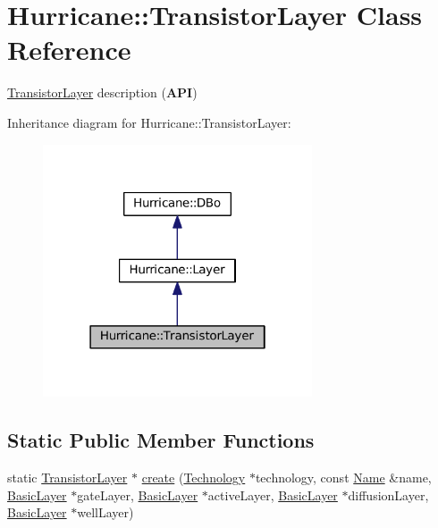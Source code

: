 \hypertarget{classHurricane_1_1TransistorLayer}{}\section{Hurricane\+:\+:Transistor\+Layer Class Reference}
\label{classHurricane_1_1TransistorLayer}


\mbox{\hyperlink{classHurricane_1_1TransistorLayer}{Transistor\+Layer}} description ({\bfseries A\+PI})  




Inheritance diagram for Hurricane\+:\+:Transistor\+Layer\+:\nopagebreak
\begin{figure}[H]
\begin{center}
\leavevmode
\includegraphics[width=226pt]{classHurricane_1_1TransistorLayer__inherit__graph}
\end{center}
\end{figure}
\subsection*{Static Public Member Functions}
\begin{DoxyCompactItemize}
\item 
static \mbox{\hyperlink{classHurricane_1_1TransistorLayer}{Transistor\+Layer}} $\ast$ \mbox{\hyperlink{classHurricane_1_1TransistorLayer_ac34a9a0c5056f1f483b670a1e929ed93}{create}} (\mbox{\hyperlink{classHurricane_1_1Technology}{Technology}} $\ast$technology, const \mbox{\hyperlink{classHurricane_1_1Name}{Name}} \&name, \mbox{\hyperlink{classHurricane_1_1BasicLayer}{Basic\+Layer}} $\ast$gate\+Layer, \mbox{\hyperlink{classHurricane_1_1BasicLayer}{Basic\+Layer}} $\ast$active\+Layer, \mbox{\hyperlink{classHurricane_1_1BasicLayer}{Basic\+Layer}} $\ast$diffusion\+Layer, \mbox{\hyperlink{classHurricane_1_1BasicLayer}{Basic\+Layer}} $\ast$well\+Layer)
\end{DoxyCompactItemize}
